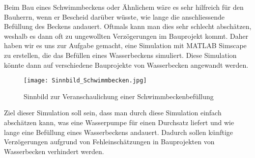 Beim Bau eines Schwimmbeckens oder Ähnlichem wäre es sehr hilfreich für den 	Bauherrn, wenn er Bescheid darüber wüsste, wie lange die anschliessende 		Befüllung des Beckens andauert. Oftmals kann man dies sehr schlecht 			abschätzen, weshalb es dann oft zu ungewollten Verzögerungen im 				Bauprojekt kommt. Daher haben wir es uns zur Aufgabe gemacht, eine 				Simulation mit MATLAB Simscape zu erstellen, die das Befüllen eines 			Wasserbeckens simuliert. Diese Simulation könnte dann auf verschiedene 			Bauprojekte von Wasserbecken angewandt werden.

\begin{figure}[htb]
\texttt{[image: Sinnbild\_Schwimmbecken.jpg]}
\caption{Sinnbild zur Veranschaulichung einer Schwimmbeckenbefüllung}
\label{fig:Sinnbild zur Veranschaulichung einer Schwimmbeckenbefüllung}
\end{figure}

Ziel dieser Simulation soll sein, dass man durch diese Simulation einfach abschätzen kann, was eine Wasserpumpe für einen Durchsatz liefert und wie lange eine Befüllung eines Wasserbeckens andauert. Dadurch sollen künftige Verzögerungen aufgrund von Fehleinschätzungen in Bauprojekten von 				Wasserbecken verhindert werden.